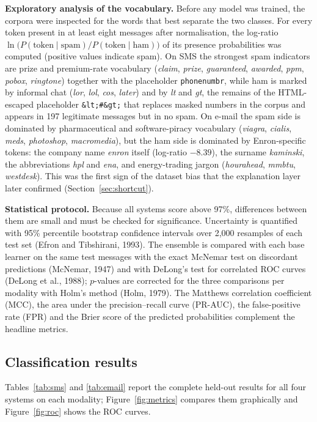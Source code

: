 \documentclass[12pt,a4paper]{report}
\begin{document}
\textbf{Exploratory analysis of the vocabulary.} Before any model was trained,
the corpora were inspected for the words that best separate the two classes.
For every token present in at least eight messages after normalisation, the
log-ratio $\ln\bigl(P(\text{token}\mid\text{spam})/P(\text{token}\mid\text{ham})\bigr)$
of its presence probabilities was computed (positive values indicate spam). On SMS the strongest spam indicators are prize and
premium-rate vocabulary (\emph{claim}, \emph{prize}, \emph{guaranteed},
\emph{awarded}, \emph{ppm}, \emph{pobox}, \emph{ringtone}) together with the
placeholder \texttt{phonenumbr}, while ham is marked by informal chat
(\emph{lor}, \emph{lol}, \emph{cos}, \emph{later}) and by \emph{lt} and
\emph{gt}, the remains of the HTML-escaped placeholder \texttt{\&lt;\#\&gt;}
that replaces masked numbers in the corpus and appears in 197 legitimate
messages but in no spam. On e-mail the spam side is dominated by
pharmaceutical and software-piracy vocabulary (\emph{viagra}, \emph{cialis},
\emph{meds}, \emph{photoshop}, \emph{macromedia}), but the ham side is
dominated by Enron-specific tokens: the company name \emph{enron} itself
(log-ratio $-8.39$), the surname \emph{kaminski}, the abbreviations
\emph{hpl} and \emph{ena}, and energy-trading jargon (\emph{hourahead},
\emph{mmbtu}, \emph{westdesk}). This was the first sign of the dataset bias
that the explanation layer later confirmed (Section~\ref{sec:shortcut}).

\textbf{Statistical protocol.} Because all systems score above 97\%,
differences between them are small and must be checked for significance.
Uncertainty is quantified with 95\% percentile bootstrap confidence intervals
over 2,000 resamples of each test set (Efron and Tibshirani, 1993). The
ensemble is compared with each base learner on the same test messages with
the exact McNemar test on discordant predictions (McNemar, 1947) and with
DeLong's test for correlated ROC curves (DeLong et al., 1988); $p$-values are
corrected for the three comparisons per modality with Holm's method (Holm,
1979). The Matthews correlation coefficient (MCC), the area under the
precision--recall curve (PR-AUC), the false-positive rate (FPR) and the Brier
score of the predicted probabilities complement the headline metrics.

\subsection{Classification results}

Tables~\ref{tab:sms} and \ref{tab:email} report the complete held-out
results for all four systems on each modality; Figure~\ref{fig:metrics}
compares them graphically and Figure~\ref{fig:roc} shows the ROC curves.
\end{document}
